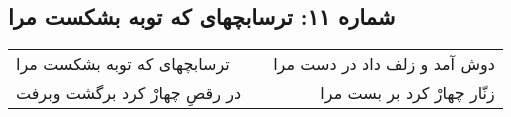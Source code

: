 \begin{center}
\section*{شماره ۱۱: ترسابچهای که توبه بشکست مرا}
\label{sec:011}
\begin{longtable}{l p{0.5cm} r}
ترسابچهای که توبه بشکست مرا
&&
دوش آمد و زلف داد در دست مرا
\\
در رقصِ چهارْ کرد برگشت وبرفت
&&
زنّار چهارْ کرد بر بست مرا
\\
\end{longtable}
\end{center}
